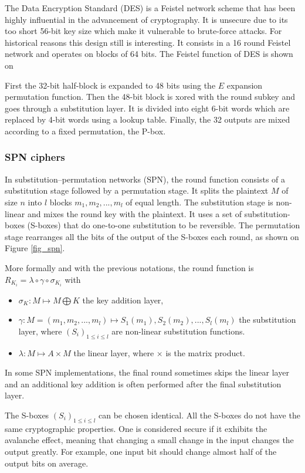 \documentclass[11pt]{sdm}
\begin{document}
The Data Encryption Standard (DES) is a Feistel network scheme that has been highly influential in the advancement of cryptography.
It is unsecure due to its too short 56-bit key size which make it vulnerable to brute-force attacks.
For historical reasons this design still is interesting.
It consists in a 16 round Feistel network and operates on blocks of 64 bits.
The Feistel function of DES is shown on %

First the 32-bit half-block is expanded to 48 bits using the $E$ expansion permutation function.
Then the 48-bit block is xored with the round subkey and goes through a substitution layer.
It is divided into eight 6-bit words which are replaced by 4-bit words using a lookup table.
Finally, the 32 outputs are mixed according to a fixed permutation, the P-box.


\subsubsection{SPN ciphers}

In substitution–permutation networks (SPN), the round function consists of a substitution stage followed by a permutation stage.
It splits the plaintext $M$ of size $n$ into $l$ blocks $m_1,m_2,...,m_l$ of equal length.
The substitution stage is non-linear and mixes the round key with the plaintext.
It uses a set of substitution-boxes (S-boxes) that do one-to-one substitution to be reversible.
The permutation stage rearranges all the bits of the output of the S-boxes each round, as shown on Figure \ref{fig_spn}.

More formally and with the previous notations, the round function is $R_{K_i} = \lambda \circ \gamma \circ \sigma_{K_i}$ with
\begin{itemize}
    \item $\sigma_{K}:M \mapsto M \bigoplus K$ the key addition layer,
    \item $\gamma : M=(m_1,m_2,...,m_l) \mapsto S_1(m_1),S_2(m_2),...,S_l(m_l)$ the substitution layer, where $(S_i)_{1\leq i \leq l}$ are non-linear substitution functions.
    \item $\lambda : M \mapsto A \times M$ the linear layer, where $\times$ is the matrix product.
\end{itemize}

In some SPN implementations, the final round sometimes skips the linear layer and an additional key addition is often performed after the final substitution layer.

The S-boxes $(S_i)_{1\leq i \leq l}$ can be chosen identical. 
All the S-boxes do not have the same cryptographic properties.
One is considered secure if it exhibits the avalanche effect, meaning that changing a small change in the input changes the output greatly.
For example, one input bit should change almost half of the output bits on average.
\end{document}
